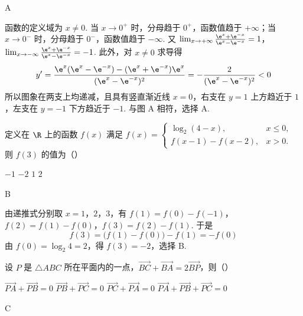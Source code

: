 \begin{answer}
A
\end{answer}

\begin{solution}
函数的定义域为 \(x\ne0\). 当 \(x\to0^+\) 时，分母趋于 \(0^+\)，函数值趋于 \(+\infty\)；当 \(x\to0^-\) 时，分母趋于 \(0^-\)，函数值趋于 \(-\infty\). 又
\(\lim_{x\to+\infty}\frac{\e^x+\e^{-x}}{\e^x-\e^{-x}}=1\)，\(\lim_{x\to-\infty}\frac{\e^x+\e^{-x}}{\e^x-\e^{-x}}=-1\).
此外，对 \(x\ne0\) 求导得
\[
y'=\frac{\e^x(\e^x-\e^{-x})-(\e^x+\e^{-x})\e^x}{(\e^x-\e^{-x})^2}=-\frac{2}{(\e^x-\e^{-x})^2}<0
\]
所以图象在两支上均递减，且具有竖直渐近线 \(x=0\)，右支在 \(y=1\) 上方趋近于 \(1\)，左支在 \(y=-1\) 下方趋近于 \(-1\). 与图 A 相符，选择 A.
\end{solution}

\begin{problem}
定义在 \(\R\) 上的函数 \(f(x)\) 满足 \(f(x) = \begin{cases}
\log_2(4 - x), & x \leqslant 0,\\
f(x - 1) - f(x - 2), & x > 0.
\end{cases}\) 则 \(f(3)\) 的值为（\quad）

\choices
    {\(-1\)}
    {\(-2\)}
    {\(1\)}
    {\(2\)}
\end{problem}

\begin{answer}
B
\end{answer}

\begin{solution}
由递推式分别取 \(x=1\)，\(2\)，\(3\)，有
\(f(1)=f(0)-f(-1)\)，\(f(2)=f(1)-f(0)\)，\(f(3)=f(2)-f(1)\).
于是
\[
f(3)=\bigl(f(1)-f(0)\bigr)-f(1)=-f(0)
\]
由 \(f(0)=\log_2 4=2\)，得 \(f(3)=-2\)，选择 B.
\end{solution}

\begin{problem}
设 \(P\) 是 \(\triangle ABC\) 所在平面内的一点，\(\overrightarrow{BC} + \overrightarrow{BA} = 2\overrightarrow{BP}\)，则（\quad）

\choices
    {\(\overrightarrow{PA} +\overrightarrow{PB} = 0\)}
    {\(\overrightarrow{PB} +\overrightarrow{PC} = 0\)}
    {\(\overrightarrow{PC} +\overrightarrow{PA} = 0\)}
    {\(\overrightarrow{PA} +\overrightarrow{PB} +\overrightarrow{PC} = 0\)}
\end{problem}

\begin{answer}
C
\end{answer}

